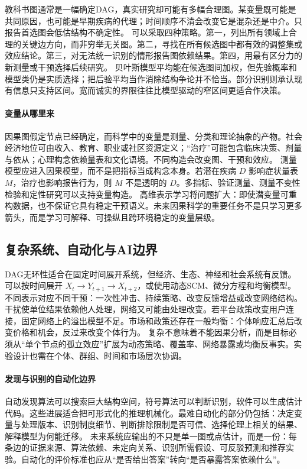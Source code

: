教科书图通常是一幅确定DAG，真实研究却可能有多幅合理图。某变量既可能是共同原因，也可能是早期疾病的代理；时间顺序不清会改变它是混杂还是中介。只报告首选图会低估结构不确定性。
可以采取四种策略。第一，列出所有领域上合理的关键边方向，而非穷举无关图。第二，寻找在所有候选图中都有效的调整集或效应结论。第三，对无法统一识别的情形报告图依赖结果。第四，用最有区分力的新测量或干预选择后续研究。
贝叶斯模型平均能在候选图间加权，但先验概率和模型类仍是实质选择；把后验平均当作消除结构争论并不恰当。部分识别则承认现有信息只支持区间。宽而诚实的界限往往比模型驱动的窄区间更适合作决策。

\paragraph{变量从哪里来}

因果图假定节点已经确定，而科学中的变量是测量、分类和理论抽象的产物。社会经济地位可由收入、教育、职业或社区资源定义；“治疗”可能包含临床决策、剂量与依从；心理构念依赖量表和文化语境。不同构造会改变图、干预和效应。
测量模型应进入因果模型，而不是把指标当成构念本身。若潜在疾病 $D$ 影响症状量表 $M$，治疗也影响报告行为，则 $M$ 不是透明的 $D$。多指标、验证测量、测量不变性检验和定性研究可以支持变量构造。
高维表示学习将问题扩大：即使潜变量可重构数据，也不保证它具有稳定干预语义。未来因果科学的重要任务不是只学习更多箭头，而是学习可解释、可操纵且跨环境稳定的变量层级。

\subsection{复杂系统、自动化与AI边界}

DAG无环性适合在固定时间展开系统，但经济、生态、神经和社会系统有反馈。可以按时间展开 $X_t\rightarrow Y_{t+1}\rightarrow X_{t+2}$，或使用动态SCM、微分方程和均衡模型。不同表示对应不同干预：一次性冲击、持续策略、改变反馈增益或改变网络结构。
干扰使单位结果依赖他人处理，网络又可能由处理改变。若平台政策改变用户连接，固定网络上的溢出模型不足。市场和政策还存在一般均衡：个体响应汇总后改变价格和机会，反过来改变个体行为。
复杂不意味着不能因果分析，而是目标必须从“单个节点的孤立效应”扩展为动态策略、覆盖率、网络暴露或均衡反事实。实验设计也需在个体、群组、时间和市场层次协调。

\paragraph{发现与识别的自动化边界}

自动发现算法可以搜索巨大结构空间，符号算法可以判断识别，软件可以生成估计代码。这些进展适合把可形式化的推理机械化。最难自动化的部分仍包括：决定变量与处理版本、识别制度细节、判断排除限制是否可信、选择伦理上相关的结果、解释模型为何能迁移。
未来系统应输出的不只是单一图或点估计，而是一份：每条边的证据来源、算法依赖、未定向关系、识别所需假设、可反驳预测和推荐实验。自动化的评价标准也应从“是否给出答案”转向“是否暴露答案依赖什么”。

